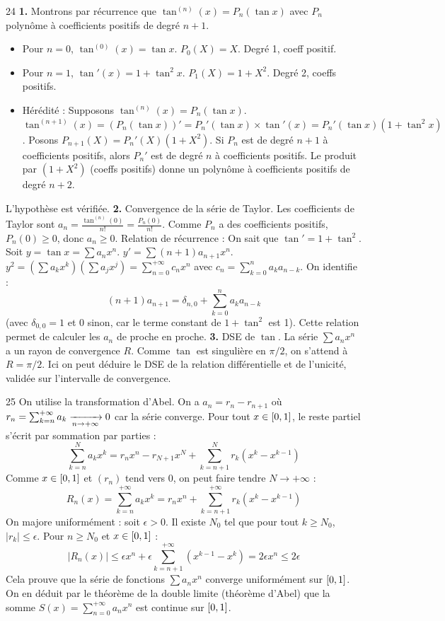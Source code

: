 \begin{correction}{24}
\textbf{1.} Montrons par récurrence que $\tan^{(n)}(x) = P_n(\tan x)$ avec $P_n$ polynôme à coefficients positifs de degré $n+1$. 
\begin{itemize}
 \item Pour $n=0$, $\tan^{(0)}(x) = \tan x$. $P_0(X) = X$. Degré 1, coeff positif. 
 \item Pour $n=1$, $\tan'(x) = 1 + \tan^2 x$. $P_1(X) = 1+X^2$. Degré 2, coeffs positifs. 
 \item Hérédité : Supposons $\tan^{(n)}(x) = P_n(\tan x)$. 
 $\tan^{(n+1)}(x) = (P_n(\tan x))' = P_n'(\tan x) \times \tan'(x) = P_n'(\tan x) (1+\tan^2 x)$. 
 Posons $P_{n+1}(X) = P_n'(X)(1+X^2)$. 
 Si $P_n$ est de degré $n+1$ à coefficients positifs, alors $P_n'$ est de degré $n$ à coefficients positifs. 
 Le produit par $(1+X^2)$ (coeffs positifs) donne un polynôme à coefficients positifs de degré $n+2$. 
\end{itemize}
L'hypothèse est vérifiée. 
\textbf{2.} Convergence de la série de Taylor. 
Les coefficients de Taylor sont $a_n = \frac{\tan^{(n)}(0)}{n!} = \frac{P_n(0)}{n!}$. 
Comme $P_n$ a des coefficients positifs, $P_n(0) \ge 0$, donc $a_n \ge 0$. 
Relation de récurrence : On sait que $\tan' = 1 + \tan^2$. 
Soit $y = \tan x = \sum a_n x^n$. $y' = \sum (n+1)a_{n+1} x^n$. 
$y^2 = \left( \sum a_k x^k \right) \left( \sum a_j x^j \right) = \sum_{n=0}^{+\infty} c_n x^n$ avec $c_n = \sum_{k=0}^n a_k a_{n-k}$. 
On identifie :
$$ (n+1)a_{n+1} = \delta_{n,0} + \sum_{k=0}^n a_k a_{n-k} $$ 
(avec $\delta_{0,0}=1$ et 0 sinon, car le terme constant de $1+\tan^2$ est 1). 
Cette relation permet de calculer les $a_n$ de proche en proche. 
\textbf{3.} DSE de $\tan$. 
La série $\sum a_n x^n$ a un rayon de convergence $R$. 
Comme $\tan$ est singulière en $\pi/2$, on s'attend à $R = \pi/2$. 
Ici on peut déduire le DSE de la relation différentielle et de l'unicité, validée sur l'intervalle de convergence. 
\end{correction}

\begin{correction}{25}
On utilise la transformation d'Abel. 
On a $a_n = r_n - r_{n+1}$ où $r_n = \sum_{k=n}^{+\infty} a_k \xrightarrow[n \to +\infty]{} 0$ car la série converge. 
Pour tout $x \in \left[0, 1\right]$, le reste partiel s'écrit par sommation par parties : 
$$ \sum_{k=n}^N a_k x^k = r_n x^n - r_{N+1}x^N + \sum_{k=n+1}^N r_k (x^k - x^{k-1}) $$
Comme $x \in \left[0, 1\right]$ et $(r_n)$ tend vers 0, on peut faire tendre $N \to +\infty$ :
$$ R_n(x) = \sum_{k=n}^{+\infty} a_k x^k = r_n x^n + \sum_{k=n+1}^{+\infty} r_k (x^k - x^{k-1}) $$ 
On majore uniformément : soit $\epsilon > 0$. Il existe $N_0$ tel que pour tout $k \ge N_0$, $|r_k| \le \epsilon$. 
Pour $n \ge N_0$ et $x \in \left[0, 1\right]$ : 
$$ |R_n(x)| \le \epsilon x^n + \epsilon \sum_{k=n+1}^{+\infty} (x^{k-1} - x^k) = 2\epsilon x^n \le 2\epsilon $$ 
Cela prouve que la série de fonctions $\sum a_n x^n$ converge uniformément sur $\left[0, 1\right]$. 
On en déduit par le théorème de la double limite (théorème d'Abel) que la somme $S(x) = \sum_{n=0}^{+\infty} a_n x^n$ est continue sur $\left[0, 1\right]$. 
\end{correction}
